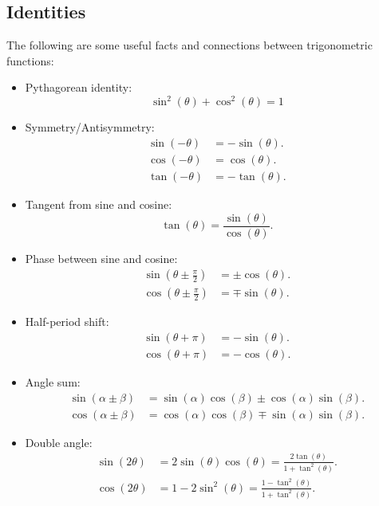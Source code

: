 \subsection{Identities}
The following are some useful facts and connections between trigonometric functions:
\begin{itemize}
	\item Pythagorean identity:
		\begin{equation}
			\sin^{2}(\theta) + \cos^{2}(\theta) = 1
		\end{equation}
	
	\item Symmetry/Antisymmetry:
		\begin{align}
			\sin(-\theta) &= -\sin(\theta).\\
			\cos(-\theta) &= \cos(\theta).\\
			\tan(-\theta) &= -\tan(\theta).
		\end{align}
	
	\item Tangent from sine and cosine:
		\begin{equation}
			\tan(\theta)=\frac{\sin(\theta)}{\cos(\theta)}.
		\end{equation}
	
	\item Phase between sine and cosine:
		\begin{align}
			\sin\left(\theta\pm\frac{\pi}{2}\right) &= \pm\cos(\theta).\\
			\cos\left(\theta\pm\frac{\pi}{2}\right) &= \mp\sin(\theta).
		\end{align}
	
	\item Half-period shift:
		\begin{align}
			\sin(\theta+\pi) &= -\sin(\theta).\\
			\cos(\theta+\pi) &= -\cos(\theta).
		\end{align}
	
	\item Angle sum:
		\begin{align}
			\sin(\alpha\pm\beta) &= \sin(\alpha)\cos(\beta)\pm\cos(\alpha)\sin(\beta).\\
			\cos(\alpha\pm\beta) &= \cos(\alpha)\cos(\beta)\mp\sin(\alpha)\sin(\beta).
		\end{align}
	
	\item Double angle:
		\begin{align}
			\sin(2\theta) &= 2\sin(\theta)\cos(\theta) = \frac{2\tan \left( \theta \right)}{1+\tan^{2} \left( \theta \right)}.\\
			\cos(2\theta) &= 1-2\sin^{2}(\theta) = \frac{1-\tan^{2} \left( \theta \right) }{1+\tan^{2} \left( \theta \right)}.
			\label{eq:tan_double_angles}
		\end{align}
	

\end{itemize}

